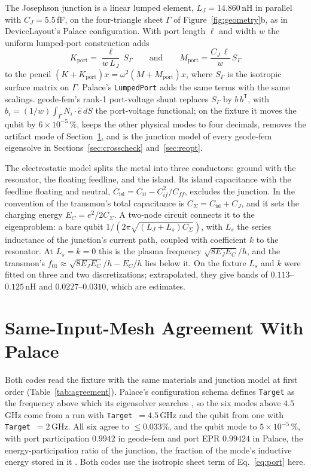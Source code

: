 \documentclass{anvil-paper}
\newcommand{\Cisl}{C_{\mathrm{isl}}}
\begin{document}
The Josephson junction is a linear lumped element, $L_J = 14.860$\,nH in
parallel with $C_J = 5.5$\,fF, on the four-triangle sheet $\Gamma$ of
Figure~\ref{fig:geometry}b, as in DeviceLayout's Palace configuration. With
port length $\ell$ and width $w$ the uniform lumped-port construction adds
\begin{equation}
  K_{\mathrm{port}} = \frac{\ell}{w\,L_J}\, S_\Gamma
  \qquad\text{and}\qquad
  M_{\mathrm{port}} = \frac{C_J\,\ell}{w}\, S_\Gamma
  \label{eq:port}
\end{equation}
to the pencil $(K + K_{\mathrm{port}})x = \omega^2(M + M_{\mathrm{port}})x$,
where $S_\Gamma$ is the isotropic surface matrix on $\Gamma$. Palace's
\texttt{LumpedPort} adds the same terms with the same scalings. geode-fem's
rank-1 port-voltage shunt replaces $S_\Gamma$ by $b\,b^{\mathsf T}$, with
$b_i = (1/w)\int_\Gamma N_i\cdot\hat e\,dS$ the port-voltage functional; on
the fixture it moves the qubit by $6\times10^{-5}\,\%$, keeps the other
physical modes to four decimals, removes the
artifact mode of Section~\ref{sec:agreement}, and is the junction model of
every geode-fem eigensolve in Sections~\ref{sec:crosscheck}
and~\ref{sec:reopt}.

The electrostatic model splits the metal into three conductors: ground
with the resonator, the floating feedline, and the island. Its island
capacitance with the feedline floating and neutral,
$\Cisl = C_{ii} - C_{if}^2/C_{ff}$, excludes the junction. In the
convention of \citet{koch2007charge} the transmon's total capacitance is
$C_\Sigma = \Cisl + C_J$, and it sets the charging energy $E_C =
e^2/2C_\Sigma$. A two-node circuit connects it to the eigenproblem: a bare
qubit $1/(2\pi\sqrt{(L_J + L_s)C_\Sigma})$, with $L_s$ the series
inductance of the junction's current path, coupled with coefficient $k$
to the resonator. At $L_s = k = 0$ this is the plasma frequency
$\sqrt{8E_JE_C}/h$, and the transmon's $f_{01} \approx \sqrt{8E_JE_C}/h -
E_C/h$ lies below it. On the fixture $L_s$ and $k$ were fitted on three and
two discretizations; extrapolated, they give bands of $0.113$--$0.125$\,nH
and $0.0227$--$0.0310$, which are estimates.

\section{Same-Input-Mesh Agreement With Palace}
\label{sec:agreement}

Both codes read the fixture with the same materials and junction model at
first order (Table~\ref{tab:agreement}). Palace's configuration schema
defines \texttt{Target} as the frequency above which its eigensolver
searches \citep{palace}, so the six modes above $4.5$\,GHz come from a run
with \texttt{Target}~$=4.5$\,GHz and the qubit from one with
\texttt{Target}~$=2$\,GHz. All six agree to $\leq 0.033\%$, and the qubit mode to $5\times10^{-5}\,\%$, with port
participation $0.9942$ in geode-fem and port EPR $0.99424$ in Palace, the
energy-participation ratio of the junction, the fraction of the mode's
inductive energy stored in it \citep{minev2021energy}. Both codes use the
isotropic sheet term of Eq.~\eqref{eq:port} here.
\end{document}
